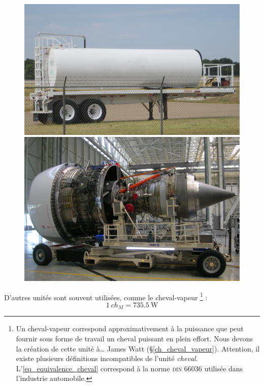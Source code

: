 		\begin{figure}
			\begin{center}
			\includegraphics[height=0.31\textwidth]{images/fueltank.jpg}
			\includegraphics[height=0.31\textwidth]{images/trent900.jpg}
			\end{center}
			\label{fig_energie_puissance}%

		\end{figure}
		
		D’autres unités sont souvent utilisées, comme le cheval-vapeur%
			\footnote{Un cheval-vapeur correspond approximativement à la puissance que peut fournir sous forme de travail un cheval puissant en plein effort. Nous devons la création de cette unité à… James Watt (\S\ref{ch_cheval_vapeur}). Attention, il existe plusieurs définitions incompatibles de l’unité \textit{cheval}. L’\cref{eq_equivalence_cheval} correspond à la norme \textsc{din} 66036 utilisée dans l’industrie automobile.} :
		\begin{equation}
			\SI{1}{ch_M} = \SI{735,5}{\watt}
			\label{eq_equivalence_cheval}
		\end{equation}

